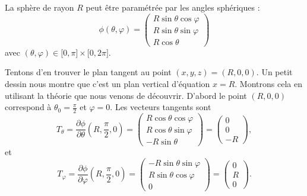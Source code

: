 \begin{example}
    La sphère de rayon $R$ peut être paramétrée par les angles sphériques :
    \begin{equation}
        \phi(\theta,\varphi)=\begin{pmatrix}
            R\sin\theta\cos\varphi    \\ 
            R\sin\theta\sin\varphi    \\ 
            R\cos\theta    
        \end{pmatrix}
    \end{equation}
    avec $(\theta,\varphi)\in\mathopen[ 0 , \pi \mathclose]\times \mathopen[ 0 , 2\pi \mathclose]$.

    Tentons d'en trouver le plan tangent au point $(x,y,z)=(R,0,0)$. Un petit dessin nous montre que c'est un plan vertical d'équation $x=R$. Montrons cela en utilisant la théorie que nous venons de découvrir. D'abord le point $(R,0,0)$ correspond à $\theta_0=\frac{ \pi }{ 2 }$ et $\varphi=0$. Les vecteurs tangents sont
    \begin{equation}        \label{EqTthetaSph}
        T_{\theta}=\frac{ \partial \phi }{ \partial \theta }(R,\frac{ \pi }{2},0)=\begin{pmatrix}
            R\cos\theta\cos\varphi    \\ 
            R\cos\theta\sin\varphi    \\ 
            -R\sin\theta    
        \end{pmatrix}=\begin{pmatrix}
            0    \\ 
            0    \\ 
            -R    
        \end{pmatrix},
    \end{equation}
    et
    \begin{equation}    \label{EqTvarphiSph}
        T_{\varphi}=\frac{ \partial \phi }{ \partial \varphi }(R,\frac{ \pi }{2},0)=\begin{pmatrix}
            -R\sin\theta\sin\varphi\\
            R\sin\theta\cos\varphi\\
            0
        \end{pmatrix}=\begin{pmatrix}
            0    \\ 
            R    \\ 
            0    
        \end{pmatrix}.
    \end{equation}

\end{example}
